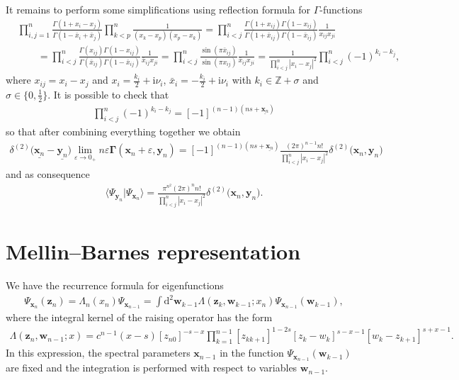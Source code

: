 \documentclass[pdftex]{sigma}
\renewcommand{\imath}{\mathrm{i}}
\numberwithin{equation}{section}
\begin{document}
It remains to perform some simplifications using
reflection formula for $\Gamma$-functions
\begin{align*}
&
\prod\limits_{i,j=1}^n
\frac{\Gamma(1+x_i-x_j)}{\Gamma(1 -\bar{x}_i+\bar{x}_j)}
\prod\limits_{k<p}^n \frac{1}
{(x_{k}-x_{p}) (x_{p}-x_{k})} =
\prod\limits_{i<j}^n
\frac{\Gamma(1+x_{ij})\Gamma(1-x_{ij})}
{\Gamma(1+\bar{x}_{ij})\Gamma(1 -\bar{x}_{ij})} \frac{1}
{x_{ij} x_{ji}} \\
& \qquad=
\prod\limits_{i<j}^n
\frac{\Gamma(x_{ij})\Gamma(1-x_{ij})}
{\Gamma(\bar{x}_{ij})\Gamma(1 -\bar{x}_{ij})} \frac{1}
{\bar{x}_{ij} x_{ji}} = \prod\limits_{i<j}^n
\frac{\sin(\pi \bar{x}_{ij})}
{\sin(\pi x_{ij})} \frac{1}
{\bar{x}_{ij} x_{ji}} = \frac{1}
{\prod\limits_{i<j}^n |x_i-x_j|^2}
\prod\limits_{i<j}^n (-1)^{k_i-k_j} ,
\end{align*}
where $x_{ij} = x_i-x_j$ and
$x_i = \tfrac{k_i}{2}+\imath\nu_i$, $\bar{x}_i = -\tfrac{k_i}{2}+\imath\nu_i$
with $k_i \in \mathbb{Z}+\sigma$ and $\sigma \in \bigl\{0, \tfrac{1}{2}\bigr\}$.
It is possible to check that
\begin{align*}
\prod\limits_{i<j}^n (-1)^{k_i-k_j} = [-1]^{(n-1)(ns+\underline{\bm{x}_n})}
\end{align*}
so that after combining everything together we obtain
\begin{align*}
\delta^{(2)}\bigl(\underline{\bm{x}_n}-\underline{\bm{y}_n}\bigr)
\lim_{\varepsilon\to 0_+}
n \varepsilon \mathbf{\Gamma}(\bm{x}_n+\varepsilon, \bm{y}_n) =
[-1]^{(n-1)(ns+\underline{\bm{x}_n})}
\frac{(2\pi)^{n-1} n! }{\prod\limits_{i<j}^n |x_i-x_j|^2}
\delta^{(2)}\bigl(\bm{x}_n,\bm{y}_n \bigr)
\end{align*}
and as consequence
\begin{align*}
\langle\Psi_{\bm{y}_n}|\Psi_{\bm{x}_n}\rangle =
\frac{\pi^{n^2} (2\pi)^{n} n!}{\prod\limits_{i<j}^n |x_i-x_j|^2}
\delta^{(2)}\bigl(\bm{x}_n,\bm{y}_n \bigr) .
\end{align*}


\section{Mellin--Barnes representation}
\label{sect:MB}

We have the recurrence formula for eigenfunctions
\begin{align*}
\Psi_{\bm{x}_n}(\bm{z}_n) =
\Lambda_n( x_n) \Psi_{\bm{x}_{n-1}} = \int \mathrm{d}^{2} \bm w_{k-1}
\Lambda(\bm z_k,\bm w_{k-1};x_n)
\Psi_{\bm{x}_{n-1}}(\bm w_{k-1}) ,
\end{align*}
where the integral kernel of the raising operator has the form
\begin{align*}
\Lambda(\bm z_n,\bm w_{n-1};x) =
c^{n-1}(x-s) [z_{n0}]^{-s-x}
\prod\limits_{k=1}^{n-1}
[z_{k k+1}]^{1-2s}[z_k-w_k]^{s-x-1}[w_k -z_{k+1}]^{s+x-1} .
\end{align*}
In this expression, the spectral parameters $\bm{x}_{n-1}$ in the function
$\Psi_{\bm{x}_{n-1}}(\bm w_{k-1})$ are fixed and the integration is performed with respect to variables $\bm{w}_{n-1}$.
\end{document}
